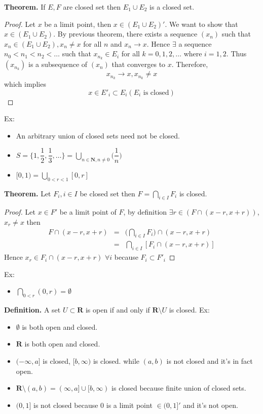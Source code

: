 \documentclass[10pt,letterpaper]{article}
\begin{document}
	\textbf{Theorem. }
	If $E, F$ are closed set then $E_1 \cup E_2$ is a closed set.
	\begin{proof}
		Let $x$ be a limit point, then $x \in (E_1 \cup E_2)'$. We want to show that
		$x \in (E_1 \cup E_2)$. By previous theorem, there exists a sequence $(x_n)$ such that
		$x_n \in (E_1 \cup E_2), x_n \neq x$ for all $n$ and $x_n \rightarrow x$.  Hence
		$\exists$ a sequence $n_0 < n_1 < n_2 < \ldots $ such that $x_{n_k} \in E_i$ for all $k = 0, 1, 2, \ldots$
		where $i = 1, 2$. Thus $(x_{n_k})$ is a subsequence of $(x_n)$ that converges to $x$.
		Therefore,
		$$x_{n_k} \rightarrow x, x_{n_k} \neq x$$
		which implies
		$$x \in E'_i \subset E_i (E_i\text{ is closed})$$		
	\end{proof}
	
	Ex: \\
	\begin{itemize}
		\item An arbitrary union of closed sets need not be closed.
		\item $S = \{1, \dfrac{1}{2}, \dfrac{1}{3}, \ldots \} = \displaystyle\bigcup_{n \in \mathbf{N}, n \neq 0}
		\bigg( \dfrac{1}{n} \bigg)$
		\item $[0, 1) = \displaystyle\bigcup_{0 < r < 1} [0, r]$ 
	\end{itemize}
	
	\textbf{Theorem. } Let $F_i, i \in I$ be closed set then 
	$F = \displaystyle\bigcap_{i \in I}F_i$ is closed.
	\begin{proof}
		Let $x \in F'$ be a limit point of $F$, by definition $\exists r \in (F \cap (x - r, x + r))$, $x_r \neq x$
		then 
		\begin{eqnarray*}	
		F \cap (x - r, x + r) &=& \bigg(\displaystyle\bigcap_{i \in I}F_i\bigg)
		\cap (x - r, x + r) \\
		&=& \displaystyle\bigcap_{i \in I} [F_i \cap (x - r, x + r)]
		\end{eqnarray*}	
		Hence $x_r \in F_i \cap (x - r, x + r) \, \, \forall i$ because $F_i \subset F'_i$
	\end{proof}
	Ex:
	\begin{itemize}
		\item $\displaystyle\bigcap_{0 < r}(0, r) = \emptyset$
	\end{itemize}
	
	\textbf{Definition. } A set $U \subset \mathbf{R}$ is open if and only if $\mathbf{R} \setminus U$ is closed.
	Ex: \\
	\begin{itemize}
		\item $\emptyset$ is both open and closed. 
		\item $\mathbf{R}$ is both open and closed.
		\item $(-\infty, a]$ is closed, $[b, \infty)$ is closed.
		while $(a, b)$ is not closed and it's in fact open.
		\item $\mathbf{R} \setminus (a, b) = (\infty, a] \cup [b, \infty)$ is closed
		because finite union of closed sets.
		\item $(0, 1]$ is not closed because $0$ is a limit point $\in (0, 1]'$ and it's not open.
	\end{itemize}
	
\end{document}
